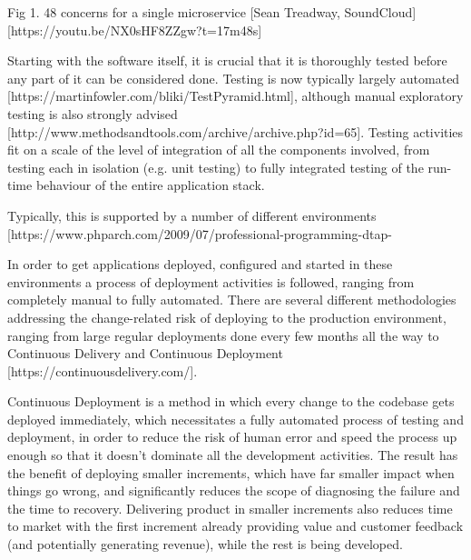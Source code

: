 \documentclass[reprint,amsmath,amssymb,aps]{revtex4-1}
\begin{document}
Fig 1. 48 concerns for a single microservice [Sean Treadway, SoundCloud] [https://youtu.be/NX0sHF8ZZgw?t=17m48s]

Starting with the software itself, it is crucial that it is thoroughly tested before any part of it can be considered done. Testing is now typically largely automated [https://martinfowler.com/bliki/TestPyramid.html], although manual exploratory testing is also strongly advised [http://www.methodsandtools.com/archive/archive.php?id=65]. Testing activities fit on a scale of the level of integration of all the components involved, from testing each in isolation (e.g. unit testing) to fully integrated testing of the run-time behaviour of the entire application stack. 

Typically, this is supported by a number of different environments [https://www.phparch.com/2009/07/professional-programming-dtap-%

In order to get applications deployed, configured and started in these environments a process of deployment activities is followed, ranging from completely manual to fully automated. There are several different methodologies addressing the change-related risk of deploying to the production environment, ranging from large regular deployments done every few months all the way to Continuous Delivery and Continuous Deployment [https://continuousdelivery.com/]. 

Continuous Deployment is a method in which every change to the codebase gets deployed immediately, which necessitates a fully automated process of testing and deployment, in order to reduce the risk of human error and speed the process up enough so that it doesn’t dominate all the development activities. The result has the benefit of deploying smaller increments, which have far smaller impact when things go wrong, and significantly reduces the scope of diagnosing the failure and the time to recovery. Delivering product in smaller increments also reduces time to market with the first increment already providing value and customer feedback (and potentially generating revenue), while the rest is being developed.
\end{document}

